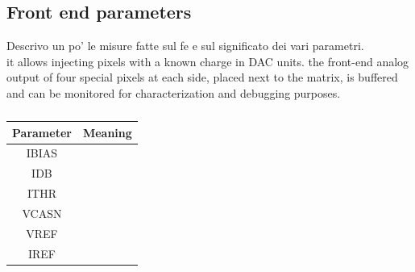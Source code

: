     \subsection{Front end parameters}
        Descrivo un po' le misure fatte sul fe e sul significato dei vari parametri.\\
        it allows injecting pixels with a known charge in DAC units. 
        the front-end analog
        output of four special pixels at each side, placed next to the matrix, is buffered and can be monitored
        for characterization and debugging purposes.
        \begin{table}
            \begin{center}
            \begin{tabular}{|c | c |}
            \hline
            Parameter & Meaning\\
            \hline
            \hline
            IBIAS &\\
            IDB &\\
            ITHR & \\
            VCASN &\\
            VREF &\\
            IREF &\\
            \hline
            \end{tabular}
            \caption{}
            \label{tab:FE-parameters}
            \end{center}
        \end{table}
    
